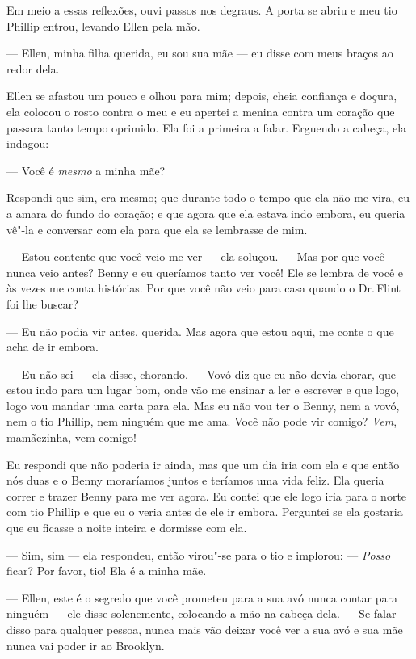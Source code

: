 Em meio a essas reflexões, ouvi passos
nos degraus. A porta se abriu e meu tio Phillip entrou, levando Ellen
pela mão.

--- Ellen, minha filha querida, eu sou sua mãe --- eu disse com meus
braços ao redor dela.

Ellen se afastou um pouco e olhou para mim; depois, cheia confiança e
doçura, ela colocou o rosto contra o meu e eu apertei a menina contra um
coração que passara tanto tempo oprimido. Ela foi a primeira a falar.
Erguendo a cabeça, ela indagou:

--- Você é \emph{mesmo} a minha mãe?

Respondi que sim, era mesmo; que durante todo o tempo que ela não me
vira, eu a amara do fundo do coração; e que agora que ela estava indo
embora, eu queria vê"-la e conversar com ela para que ela se lembrasse de
mim.

--- Estou contente que você veio me ver --- ela soluçou. --- Mas por que
você nunca veio antes? Benny e eu queríamos tanto ver você! Ele se
lembra de você e às vezes me conta histórias. Por que você não veio para
casa quando o Dr.\,Flint foi lhe buscar?

--- Eu não podia vir antes, querida.
Mas agora que estou aqui, me conte o que acha de ir embora.

--- Eu não sei --- ela disse, chorando. --- Vovó diz que eu não devia
chorar, que estou indo para um lugar bom, onde vão me ensinar a ler e
escrever e que logo, logo vou mandar uma carta para ela. Mas eu não vou
ter o Benny, nem a vovó, nem o tio Phillip, nem ninguém que me ama. Você
não pode vir comigo? \emph{Vem}, mamãezinha, vem comigo!

Eu respondi que não poderia ir ainda,
mas que um dia iria com ela e que então nós duas e o Benny moraríamos
juntos e teríamos uma vida feliz. Ela queria correr e trazer Benny para
me ver agora. Eu contei que ele logo iria para o norte com tio Phillip e
que eu o veria antes de ele ir embora. Perguntei se ela gostaria que eu
ficasse a noite inteira e dormisse com ela.

--- Sim, sim --- ela respondeu, então virou"-se para o tio e implorou:
--- \emph{Posso} ficar? Por favor, tio! Ela é a minha mãe.

--- Ellen, este é o segredo que você prometeu para a sua avó nunca
contar para ninguém --- ele disse solenemente, colocando a mão na cabeça
dela. --- Se falar disso para qualquer pessoa, nunca mais vão deixar
você ver a sua avó e sua mãe nunca vai poder ir ao Brooklyn.


